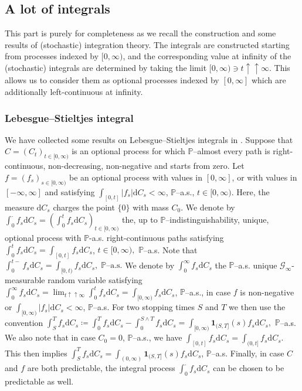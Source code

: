 \documentclass[10pt]{article} %
\newcommand\cG{\mathcal G}
\def \P{\mathbb{P}}
\def\d{\mathrm{d}}
\begin{document}
\subsection{A lot of integrals}\label{sec::integrals}

This part is purely for completeness as we recall the construction and some results of (stochastic) integration theory. The integrals are constructed starting from processes indexed by $[0,\infty)$, and the corresponding value at infinity of the (stochastic) integrals are determined by taking the limit $[0,\infty) \ni t \uparrow\uparrow \infty$. This allows us to consider them as optional processes indexed by $[0,\infty]$ which are additionally left-continuous at infinity.

\subsubsection{Lebesgue--Stieltjes integral}
We have collected some results on Lebesgue--Stieltjes integrals in . Suppose that $C = (C_t)_{t \in [0,\infty)}$ is an optional process for which $\P$--almost every path is right-continuous, non-decreasing, non-negative and starts from zero. Let $f = (f_s)_{s \in [0,\infty)}$ be an optional process with values in $[0,\infty]$, or with values in $[-\infty,\infty]$ and satisfying $\int_{[0,t]} |f_s| \d C_s < \infty$, $\P$--a.s., $t \in [0,\infty)$. Here, the measure $\d C_s$ charges the point $\{0\}$ with mass $C_0$. We denote by $\int_0^\cdot f_s \d C_s = (\int_0^t f_s \d C_s)_{t \in [0,\infty)}$ the, up to $\P$--indistinguishability, unique, optional process with $\P$-a.s. right-continuous paths satisfying  $\int_0^t f_s \d C_s = \int_{[0,t]} f_s \d C_s$, $t \in [0,\infty),$ $\P$--a.s. Note that $\int_0^{t-} f_s \d C_s = \int_{[0,t)} f_s \d C_s, \; \text{$\P$--a.s.}$ We denote by $\int_0^\infty f_s \d C_s$ the $\P$--a.s. unique $\cG_\infty$-measurable random variable satisfying $\int_0^\infty f_s \d C_s = \lim_{t \uparrow\uparrow \infty} \int_0^t f_s \d C_s = \int_{[0,\infty)} f_s \d C_s$, $\P$--a.s., in case $f$ is non-negative or $\int_{[0,\infty)} |f_s| \d C_s < \infty$, $\P$--a.s.
For two stopping times $S$ and $T$ we then use the convention $\int_S^T f_s \d C_s \coloneqq \int_0^T f_s \d C_s - \int_0^{S \land T} f_s \d C_s = \int_{[0,\infty)} \mathbf{1}_{(S,T]}(s) f_s \d C_s,$ $\P$--a.s. We also note that in case $C_0 = 0$, $\P$--a.s., we have $\int_{[0,t]} f_s \d C_s = \int_{(0,t]} f_s \d C_s$. This then implies $\int_S^T f_s \d C_s = \int_{(0,\infty)} \mathbf{1}_{(S,T]}(s) f_s \d C_s$, $\P$--a.s. Finally, in case $C$ and $f$ are both predictable, the integral process $\int_0^\cdot f_s \d C_s$ can be chosen to be predictable as well.
\end{document}

